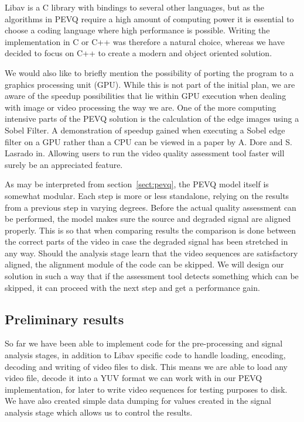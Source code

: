 Libav is a C library with bindings to several other languages, but as the algorithms in PEVQ require a high amount of computing power it is essential to choose a coding language where high performance is possible. Writing the implementation in C or C++ was therefore a natural choice, whereas we have decided to focus on C++ to create a modern and object oriented solution.

We would also like to briefly mention the possibility of porting the program to a graphics processing unit (GPU). While this is not part of the initial plan, we are aware of the speedup possibilities that lie within GPU execution when dealing with image or video processing the way we are. One of the more computing intensive parts of the PEVQ solution is the calculation of the edge images using a Sobel Filter. A demonstration of speedup gained when executing a Sobel edge filter on a GPU rather than a CPU can be viewed in a paper by A. Dore and S. Lasrado in\cite{sobelFilterGPU}. Allowing users to run the video quality assessment tool faster will surely be an appreciated feature.

As may be interpreted from section~\ref{sect:pevq}, the PEVQ model itself is somewhat modular. Each step is more or less standalone, relying on the results from a previous step in varying degrees. Before the actual quality assessment can be performed, the model makes sure the source and degraded signal are aligned properly. This is so that when comparing results the comparison is done between the correct parts of the video in case the degraded signal has been stretched in any way. Should the analysis stage learn that the video sequences are satisfactory aligned, the alignment module of the code can be skipped. 
We will design our solution in such a way that if the assessment tool detects something which can be skipped, it can proceed with the next step and get a performance gain.

\subsection{Preliminary results}\label{sect:results}

So far we have been able to implement code for the pre-processing and signal analysis stages, in addition to Libav specific code to handle loading, encoding, decoding and writing of video files to disk. This means we are able to load any video file, decode it into a YUV format we can work with in our PEVQ implementation, for later to write video sequences for testing purposes to disk. We have also created simple data dumping for values created in the signal analysis stage which allows us to control the results. 

